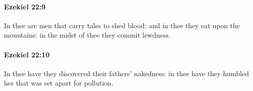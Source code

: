 		\paragraph{Ezekiel 22:9} %
			\label{EZEKIEL-22-9}

			In thee are men that carry tales to shed blood: and in thee they eat upon the mountains: in the midst of thee they commit lewdness.


		\paragraph{Ezekiel 22:10} %
			\label{EZEKIEL-22-10}

			In thee have they discovered their fathers’ nakedness: in thee have they humbled her that was set apart for pollution.


